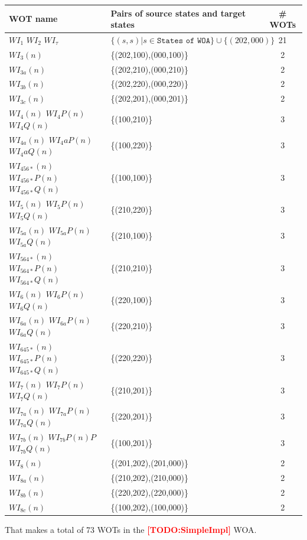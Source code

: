 \documentclass{lmcs}
\newcommand{\TODO}[1]{\textcolor{red}{\textbf{[TODO:#1]}}}
\begin{document}
\noindent\begin{tabular}{|@{\,}l@{\,}|@{\,}l@{\,}|@{\,}c@{\,}|}
\hline
    WOT name & Pairs of source states and target states & \# WOTs \\
    \hline
    $WI_1$ $WI_2$ $WI_\tau$ & $\{(s,s)| s \in \texttt{States of WOA}\} \cup \{(202,000)\} $ & 21 \\
    $WI_3(n)$ & \{(202,100),(000,100)\} & 2 \\
    $WI_{3a}(n)$ & \{(202,210),(000,210)\} & 2 \\
    $WI_{3b}(n)$ & \{(202,220),(000,220)\} & 2 \\
    $WI_{3c}(n)$ & \{(202,201),(000,201)\} & 2 \\
    $WI_4(n)$ $WI_4P(n)$ $WI_4Q(n)$ & \{(100,210)\} & 3 \\
    $WI_{4a}(n)$ $WI_4aP(n)$ $WI_4aQ(n)$ & \{(100,220)\} & 3 \\
    $WI_{456*}(n) $ $WI_{456*}P(n) $ $WI_{456*}Q(n) $ & \{(100,100)\} & 3 \\
    $WI_5(n)$ $WI_5P(n)$ $WI_5Q(n)$ & \{(210,220)\} & 3 \\
    $WI_{5a}(n)$ $WI_{5a}P(n)$ $WI_{5a}Q(n)$ & \{(210,100)\} & 3 \\
    $WI_{564*}(n) $ $WI_{564*}P(n) $ $WI_{564*}Q(n) $ & \{(210,210)\} & 3 \\
    $WI_6(n)$ $WI_6P(n)$ $WI_6Q(n)$ & \{(220,100)\} & 3 \\
    $WI_{6a}(n)$ $WI_{6a}P(n)$ $WI_{6a}Q(n)$ & \{(220,210)\} & 3 \\
    $WI_{645*}(n) $ $WI_{645*}P(n) $ $WI_{645*}Q(n) $ & \{(220,220)\} & 3 \\
    $WI_7(n)$ $WI_7P(n)$ $WI_7Q(n)$ & \{(210,201)\} & 3 \\
    $WI_{7a}(n)$ $WI_{7a}P(n)$ $WI_{7a}Q(n)$ & \{(220,201)\} & 3 \\
    $WI_{7b}(n)$ $WI_{7b}P(n)P$ $WI_{7b}Q(n)$ & \{(100,201)\} & 3 \\
    $WI_8(n)$ & \{(201,202),(201,000)\} & 2\\ 
    $WI_{8a}(n)$ & \{(210,202),(210,000)\} & 2 \\
    $WI_{8b}(n)$ & \{(220,202),(220,000)\} & 2 \\
    $WI_{8c}(n)$ & \{(100,202),(100,000)\} & 2 \\
   
    \hline
    \end{tabular}

    \bigskip
    That makes a total of 73 WOTs  in the \TODO{SimpleImpl} WOA.
\end{document}
